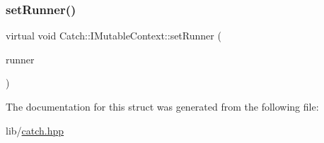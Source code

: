 \subsubsection{\texorpdfstring{set\+Runner()}{setRunner()}}
{\footnotesize\ttfamily virtual void Catch\+::\+I\+Mutable\+Context\+::set\+Runner (\begin{DoxyParamCaption}\item[{\hyperlink{struct_catch_1_1_i_runner}{I\+Runner} $\ast$}]{runner }\end{DoxyParamCaption})\hspace{0.3cm}{\ttfamily [pure virtual]}}



The documentation for this struct was generated from the following file\+:\begin{DoxyCompactItemize}
\item 
lib/\hyperlink{catch_8hpp}{catch.\+hpp}\end{DoxyCompactItemize}
